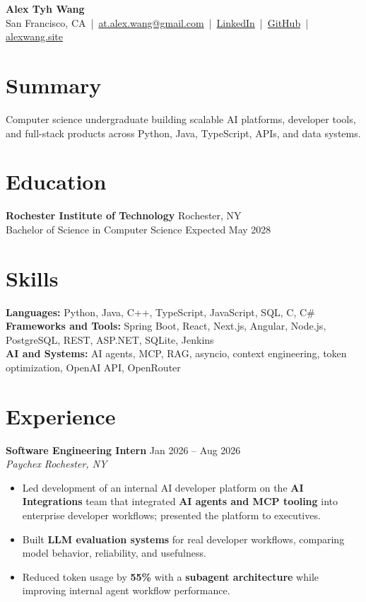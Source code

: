 \documentclass[10pt,letterpaper]{article}
\newif\ifresumeFirstRole
\newcommand{\resumeRole}[4]{%
  \ifresumeFirstRole
    \global\resumeFirstRolefalse
  \else
    \vspace{0pt plus 1fill}%
  \fi
  \textbf{#1} \hfill #2\\
  \textit{#3} \hfill \textit{#4}
}
\begin{document}
\begin{center}
{\Large \textbf{Alex Tyh Wang}}\\
San Francisco, CA \,|\, \href{mailto:at.alex.wang@gmail.com}{at.alex.wang@gmail.com} \,|\, \href{https://www.linkedin.com/in/alex-tyh-wang/}{LinkedIn} \,|\, \href{https://github.com/alextyhwang}{GitHub} \,|\, \href{https://alexwang.site}{alexwang.site}
\end{center}

\section*{Summary}
Computer science undergraduate building scalable AI platforms, developer tools, and full-stack products across Python, Java, TypeScript, APIs, and data systems.

\section*{Education}
\textbf{Rochester Institute of Technology} \hfill Rochester, NY\\
Bachelor of Science in Computer Science \hfill Expected May 2028

\section*{Skills}
\textbf{Languages:} Python, Java, C++, TypeScript, JavaScript, SQL, C, C\#\\
\textbf{Frameworks and Tools:} Spring Boot, React, Next.js, Angular, Node.js, PostgreSQL, REST, ASP.NET, SQLite, Jenkins\\
\textbf{AI and Systems:} AI agents, MCP, RAG, asyncio, context engineering, token optimization, OpenAI API, OpenRouter

\section*{Experience}
\resumeRole{Software Engineering Intern}{Jan 2026 -- Aug 2026}{Paychex}{Rochester, NY}
\begin{itemize}
  \item Led development of an internal AI developer platform on the \textbf{AI Integrations} team that integrated \textbf{AI agents and MCP tooling} into enterprise developer workflows; presented the platform to executives.
  \item Built \textbf{LLM evaluation systems} for real developer workflows, comparing model behavior, reliability, and usefulness.
  \item Reduced token usage by \textbf{55\%} with a \textbf{subagent architecture} while improving internal agent workflow performance.
\end{itemize}
\end{document}
